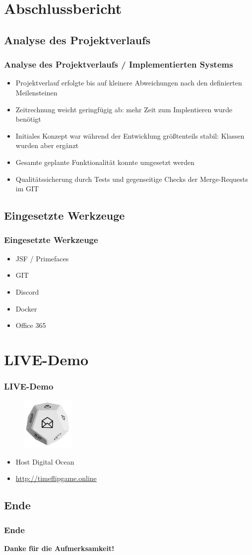 \documentclass[hyperref={pdfpagelabels=false}, xcolor=dvipsnames]{beamer}
\begin{document}
\section{Abschlussbericht}
\subsection{Analyse des Projektverlaufs}
\begin{frame}
\frametitle{Analyse des Projektverlaufs / Implementierten Systems}
\begin{itemize}
  \item Projektverlauf erfolgte bis auf kleinere Abweichungen nach den definierten Meilensteinen
  \item Zeitrechnung weicht geringfügig ab: mehr Zeit zum Implentieren wurde benötigt
  \item Initiales Konzept war während der Entwicklung größtenteils stabil: Klassen wurden aber ergänzt
  \item Gesamte geplante Funktionalität konnte umgesetzt werden
  \item Qualitätssicherung durch Tests und gegenseitige Checks der Merge-Requests im GIT 
\end{itemize}
\end{frame}

\subsection{Eingesetzte Werkzeuge}
\begin{frame}
\frametitle{Eingesetzte Werkzeuge}
\begin{itemize}
  \item JSF / Primefaces
  \item GIT
  \item Discord
  \item Docker
  \item Office 365
\end{itemize}
\end{frame}

\section{LIVE-Demo}
\begin{frame}
\frametitle{LIVE-Demo}
\begin{figure}[H]\centering
  \includegraphics[height=1in]{logo.jpg}
\end{figure}

\begin{itemize}
  \item Host Digital Ocean
  \item \url{http://timeflipgame.online}
\end{itemize}
\end{frame}

\subsection{Ende}
\begin{frame}
\frametitle{Ende}
\centering
\textbf{Danke für die Aufmerksamkeit!}
\end{frame}
\end{document}
